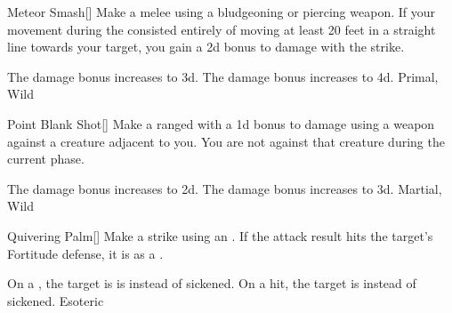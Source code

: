 \lowercase{\hypertarget{maneuver:Meteor Smash}{}}\label{maneuver:Meteor Smash}
\hypertarget{maneuver:Meteor Smash}{}
\begin{freeability}[Rank 3]{Meteor Smash}[]
Make a melee  using a bludgeoning or piercing weapon.
If your movement during the  consisted entirely of moving at least 20 feet in a straight line towards your target, you gain a \plus2d bonus to damage with the strike.

\rankline
{} The damage bonus increases to \plus3d.
 The damage bonus increases to \plus4d.
 Primal, Wild
\end{freeability}
\vspace{0.25em}



\lowercase{\hypertarget{maneuver:Point Blank Shot}{}}\label{maneuver:Point Blank Shot}
\hypertarget{maneuver:Point Blank Shot}{}
\begin{freeability}[Rank 3]{Point Blank Shot}[]
Make a ranged  with a \plus1d bonus to damage using a  weapon against a creature adjacent to you.
You are not  against that creature during the current phase.

\rankline
{} The damage bonus increases to \plus2d.
 The damage bonus increases to \plus3d.
 Martial, Wild
\end{freeability}
\vspace{0.25em}



\lowercase{\hypertarget{maneuver:Quivering Palm}{}}\label{maneuver:Quivering Palm}
\hypertarget{maneuver:Quivering Palm}{}
\begin{freeability}[Rank 3]{Quivering Palm}[]
Make a strike using an .
If the attack result hits the target's Fortitude defense,
it is  as a .

\rankline
{} On a , the target is is  instead of sickened.
 On a hit, the target is  instead of sickened.
 Esoteric
\end{freeability}
\vspace{0.25em}



